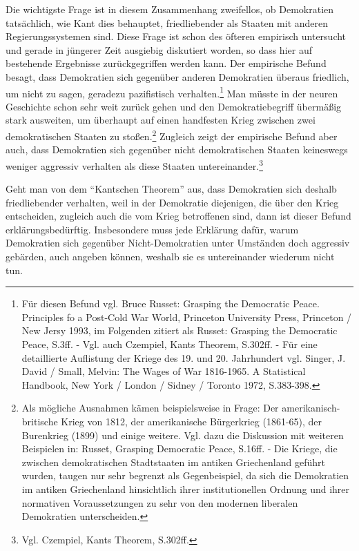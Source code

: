 \documentclass[12pt,a4paper,ngerman]{article}
\begin{document}
Die wichtigste Frage ist in diesem Zusammenhang zweifellos, ob
Demokratien tatsächlich, wie Kant dies behauptet, friedliebender als
Staaten mit anderen Regierungssystemen sind. Diese Frage ist schon des
öfteren empirisch untersucht und gerade in jüngerer Zeit ausgiebig
diskutiert worden, so dass hier auf bestehende Ergebnisse
zurückgegriffen werden kann. Der empirische Befund besagt, dass
Demokratien sich gegenüber anderen Demokratien überaus friedlich, um
nicht zu sagen, geradezu pazifistisch verhalten.\footnote{Für diesen
  Befund vgl. Bruce Russet: Grasping the Democratic Peace. Principles
  fo a Post-Cold War World, Princeton University Press, Princeton /
  New Jersy 1993, im Folgenden zitiert als Russet: Grasping the
  Democratic Peace, S.3ff. - Vgl. auch Czempiel, Kants Theorem,
  S.302ff. - Für eine detaillierte Auflistung der Kriege des 19. und
  20. Jahrhundert vgl. Singer, J. David / Small, Melvin: The Wages of
  War 1816-1965. A Statistical Handbook, New York / London / Sidney /
  Toronto 1972, S.383-398.}  Man müsste in der neuren Geschichte schon
sehr weit zurück gehen und den Demokratiebegriff übermäßig stark
ausweiten, um überhaupt auf einen handfesten Krieg zwischen zwei
demokratischen Staaten zu stoßen.\footnote{Als mögliche Ausnahmen
  kämen beispielsweise in Frage: Der amerikanisch-britische Krieg von
  1812, der amerikanische Bürgerkrieg (1861-65), der Burenkrieg (1899)
  und einige weitere. Vgl. dazu die Diskussion mit weiteren Beispielen
  in: Russet, Grasping Democratic Peace, S.16ff. - Die Kriege, die
  zwischen demokratischen Stadtstaaten im antiken Griechenland geführt
  wurden, taugen nur sehr begrenzt als Gegenbeispiel, da sich die
  Demokratien im antiken Griechenland hinsichtlich ihrer
  institutionellen Ordnung und ihrer normativen Voraussetzungen zu
  sehr von den modernen liberalen Demokratien unterscheiden.} Zugleich
zeigt der empirische Befund aber auch, dass Demokratien sich gegenüber
nicht demokratischen Staaten keineswegs weniger aggressiv verhalten
als diese Staaten untereinander.\footnote{Vgl. Czempiel, Kants
  Theorem, S.302ff.}

Geht man von dem "`Kantschen Theorem"' aus, dass Demokratien sich
deshalb friedliebender verhalten, weil in der Demokratie diejenigen,
die über den Krieg entscheiden, zugleich auch die vom Krieg betroffenen
sind, dann ist dieser Befund erklärungsbedürftig.  Insbesondere muss
jede Erklärung dafür, warum Demokratien sich gegenüber
Nicht-Demokratien unter Umständen doch aggressiv gebärden, auch
angeben können, weshalb sie es untereinander wiederum nicht tun.
\end{document}
